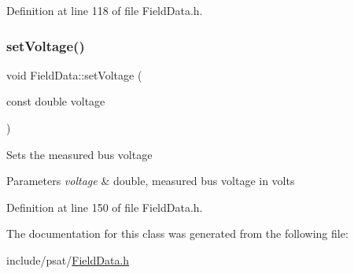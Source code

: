 Definition at line 118 of file Field\+Data.\+h.

\mbox{\label{class_field_data_a8e610f5861b66a36b1e4df2047d21245}} 
\subsubsection{\texorpdfstring{set\+Voltage()}{setVoltage()}}
{\footnotesize\ttfamily void Field\+Data\+::set\+Voltage (\begin{DoxyParamCaption}\item[{const double}]{voltage }\end{DoxyParamCaption})\hspace{0.3cm}{\ttfamily [inline]}}

Sets the measured bus voltage 
\begin{DoxyParams}{Parameters}
{\em voltage} & double, measured bus voltage in volts \\
\hline
\end{DoxyParams}


Definition at line 150 of file Field\+Data.\+h.



The documentation for this class was generated from the following file\+:\begin{DoxyCompactItemize}
\item 
include/psat/\hyperlink{_field_data_8h}{Field\+Data.\+h}\end{DoxyCompactItemize}
